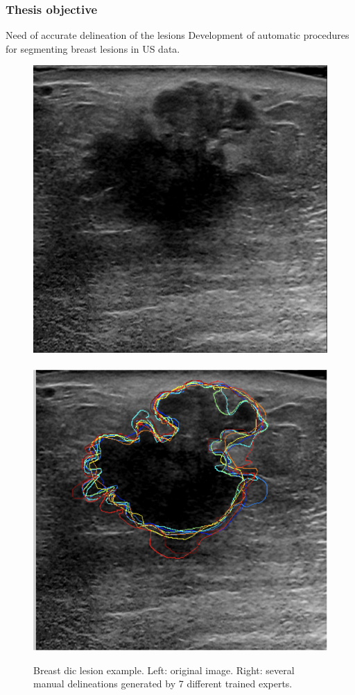 \begin{frame}\frametitle{Thesis objective}
\vspace{-5pt}
\begin{block}{Need of accurate delineation of the lesions}
{Development of automatic procedures for segmenting breast lesions in US data.}
\end{block}
\begin{figure}
\includegraphics[trim=0 6 0 0,clip,height=.5\textheight]{a110105_094.png}~
\includegraphics[trim=6 0 0 0,clip,height=.5\textheight]{segment.png}
\caption{Breast \acf{dic} lesion example. Left: original image. Right: several manual delineations generated by 7 different trained experts.}
\end{figure}
\end{frame}
